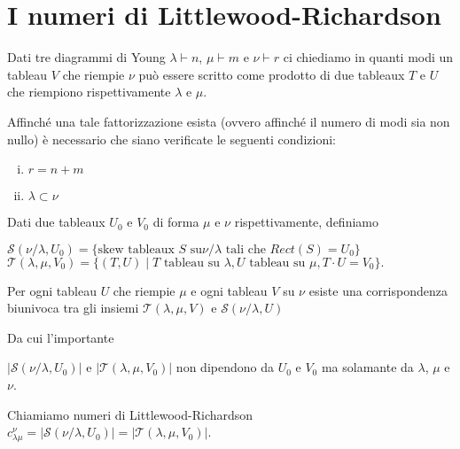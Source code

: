 \section{I numeri di Littlewood-Richardson}

Dati tre diagrammi di Young $\lambda \vdash n$, $\mu \vdash m$ e $\nu
\vdash r$ ci chiediamo in quanti modi un tableau $V$ che riempie
$\nu$ pu\`o essere scritto come prodotto di due tableaux $T$ e $U$
che riempiono rispettivamente $\lambda$ e $\mu$.

\begin{oss}
Affinch\'e una tale fattorizzazione esista (ovvero affinch\'e il numero
di modi sia non nullo) \`e necessario che siano verificate le seguenti
condizioni:
\begin{enumerate}[(i)]
\item $r = n + m$
\item $\lambda \subset \nu$
\end{enumerate}
\end{oss}

\begin{defn}
Dati due tableaux $U_0$ e $V_0$ di forma $\mu$ e $\nu$
rispettivamente, definiamo
\begin{center}\begin{math}
\mathcal{S}(\nu/\lambda, U_0) = \{\text{skew tableaux } S \text{ su
}\nu/\lambda \text{ tali che } Rect(S) =U_0\}
\end{math}\\
\begin{math}
\mathcal{T}(\lambda, \mu, V_0)=\{(T,U) \mid T \text{ tableau su }
\lambda, U \text{ tableau su } \mu, T\cdot U=V_0\}.
\end{math}\end{center}
\end{defn}

\begin{prop}
Per ogni tableau $U$ che riempie $\mu$ e ogni tableau $V$ su $\nu$
esiste una corrispondenza biunivoca tra gli insiemi $\mathcal{T}(\lambda, \mu, V)$
e $\mathcal{S}(\nu/\lambda, U)$
\end{prop}

Da cui l'importante

\begin{cor}
$ | \mathcal{S}(\nu/\lambda, U_0) |$ e $| \mathcal{T}(\lambda, \mu,
  V_0) |$ non dipendono da $U_0$ e $V_0$ ma solamante da $\lambda$,
  $\mu$ e $\nu$.
\end{cor} 

\begin{defn}
Chiamiamo numeri di Littlewood-Richardson $ c_{\lambda \mu}^{\nu} = |
\mathcal{S}(\nu/\lambda, U_0) | = | \mathcal{T}(\lambda, \mu, V_0) |$.
\end{defn}

